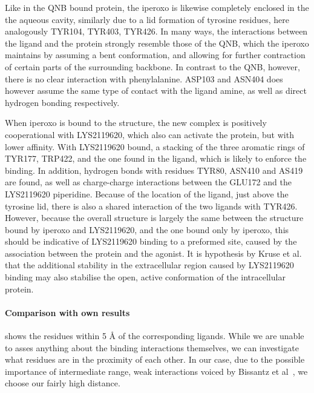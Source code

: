 \documentclass[10pt]{article}\usepackage[]{graphicx}\usepackage[]{color}
\theoremstyle{plain}
\begin{document}
\begin{multicols*}{2}
Like in the QNB bound protein, the iperoxo is likewise completely enclosed in the the aqueous cavity, similarly due to a lid formation of tyrosine residues, here analogously TYR104, TYR403, TYR426. In many ways, the interactions between the ligand and the protein strongly resemble those of the QNB, which the iperoxo maintains by assuming a bent conformation, and allowing for further contraction of certain parts of the surrounding backbone. In contrast to the QNB, however, there is no clear interaction with phenylalanine. ASP103 and ASN404 does however assume the same type of contact with the ligand amine, as well as direct hydrogen bonding respectively. 

When iperoxo is bound to the structure, the new complex is positively cooperational with LYS2119620, which also can activate the protein, but with lower affinity. With LYS2119620 bound, a stacking of the three aromatic rings of TYR177, TRP422, and the one found in the ligand, which is likely to enforce the binding. In addition, hydrogen bonds with residues TYR80, ASN410 and AS419 are found, as well as charge-charge interactions between the GLU172 and the LYS2119620 piperidine. Because of the location of the ligand, just above the tyrosine lid, there is also a shared interaction of the two ligands with TYR426. However, because the overall structure is largely the same between the structure bound by iperoxo and LYS2119620, and the one bound only by iperoxo, this should be indicative of LYS2119620 binding to a preformed site, caused by the association between the protein and the agonist. It is hypothesis by Kruse et al. that the additional stability in the extracellular region caused by LYS2119620 binding may also stabilise the open, active conformation of the intracellular protein.

\paragraph*{Comparison with own results}

 shows the residues within 5 Å of the corresponding ligands. While we are unable to asses anything about the binding interactions themselves, we can investigate what residues are in the proximity of each other. In our case, due to the possible importance of intermediate range, weak interactions voiced by Bissantz et al~\cite{Bissantz2010}, we choose our fairly high distance. 


\end{multicols*}
\end{document}
